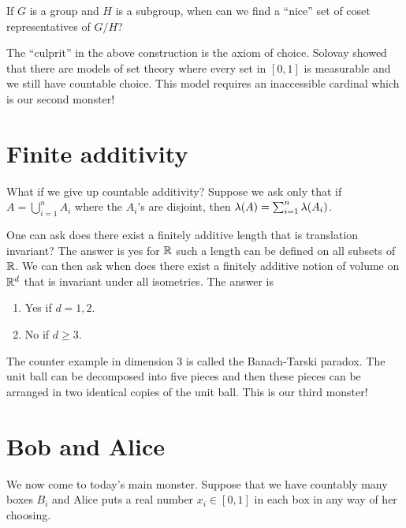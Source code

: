 \begin{question}
    If $G$ is a group and $H$ is a subgroup, when can we find a ``nice'' set of coset representatives of $G/H$? 
\end{question}    
The ``culprit'' in the above construction is the axiom of choice. Solovay showed that there are models of set theory where every set in $[0,1]$ is measurable and we still have countable choice. This model requires an inaccessible cardinal which is our second monster!
\section{Finite additivity}
What if we give up countable additivity? Suppose we ask only that if $A = \bigcup_{i=1}^n A_i$ where the $A_i$'s are disjoint, then $\lambda(A) = \sum_{i=1}^n \lambda(A_i)$. 

One can ask does there exist a finitely additive length that is translation invariant? The answer is yes for ${\mathbb R}$ such a length can be defined on all subsets of ${\mathbb R}$. We can then ask when does there exist a finitely additive notion of volume on ${\mathbb R}^d$ that is invariant under all isometries. The answer is
\begin{enumerate}
    \item Yes if $d=1,2$.
    \item No if $d \ge 3$.
\end{enumerate}
The counter example in dimension 3 is called the Banach-Tarski paradox. The unit ball can be decomposed into five pieces and then these pieces can be arranged in two identical copies of the unit ball. This is our third monster!
\section{Bob and Alice}
We now come to today's main monster. Suppose that we have countably many boxes $B_i$ and Alice puts a real number $x_i \in [0,1]$ in each box in any way of her choosing.

